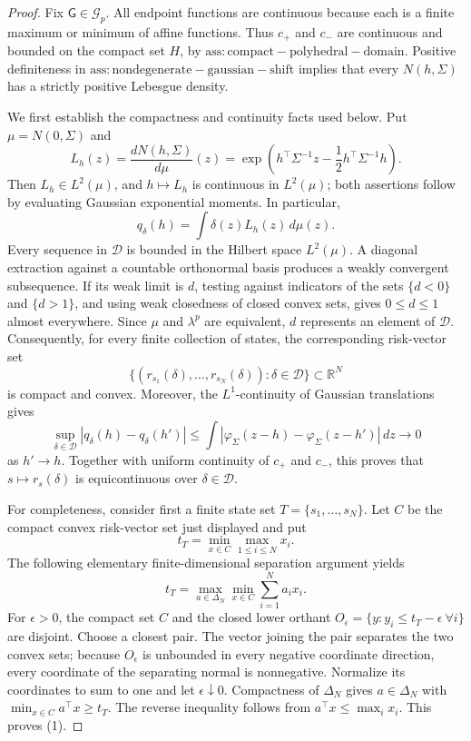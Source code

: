 \documentclass{article}
\begin{document}
\begin{proof}
Fix \(\mathsf G\in\mathcal G_p\). All endpoint functions are continuous because each is a finite maximum or minimum of affine functions. Thus \(c_{+}\) and \(c_{-}\) are continuous and bounded on the compact set \(H\), by \(\mathrm{ass:compact-polyhedral-domain}\). Positive definiteness in \(\mathrm{ass:nondegenerate-gaussian-shift}\) implies that every \(N(h,\Sigma)\) has a strictly positive Lebesgue density.

We first establish the compactness and continuity facts used below. Put \(\mu=N(0,\Sigma)\) and
\[
 L_h(z)=\frac{dN(h,\Sigma)}{d\mu}(z)
 =\exp\!\left(h^{\top}\Sigma^{-1}z-\frac12h^{\top}\Sigma^{-1}h\right).
\]
Then \(L_h\in L^2(\mu)\), and \(h\mapsto L_h\) is continuous in \(L^2(\mu)\); both assertions follow by evaluating Gaussian exponential moments. In particular,
\[
 q_{\delta}(h)=\int\delta(z)L_h(z)\,d\mu(z).
\]
Every sequence in \(\mathcal D\) is bounded in the Hilbert space \(L^2(\mu)\). A diagonal extraction against a countable orthonormal basis produces a weakly convergent subsequence. If its weak limit is \(d\), testing against indicators of the sets \(\{d<0\}\) and \(\{d>1\}\), and using weak closedness of closed convex sets, gives \(0\leq d\leq1\) almost everywhere. Since \(\mu\) and \(\lambda^p\) are equivalent, \(d\) represents an element of \(\mathcal D\). Consequently, for every finite collection of states, the corresponding risk-vector set
\[
 \bigl\{(r_{s_1}(\delta),\ldots,r_{s_N}(\delta)):\delta\in\mathcal D\bigr\}\subset\mathbb R^N
\]
is compact and convex. Moreover, the \(L^1\)-continuity of Gaussian translations gives
\[
 \sup_{\delta\in\mathcal D}|q_{\delta}(h)-q_{\delta}(h')|
 \leq\int|\varphi_{\Sigma}(z-h)-\varphi_{\Sigma}(z-h')|\,dz\longrightarrow0
\]
as \(h'\to h\). Together with uniform continuity of \(c_{+}\) and \(c_{-}\), this proves that \(s\mapsto r_s(\delta)\) is equicontinuous over \(\delta\in\mathcal D\).

For completeness, consider first a finite state set \(T=\{s_1,\ldots,s_N\}\). Let \(C\) be the compact convex risk-vector set just displayed and put
\[
 t_T=\min_{x\in C}\max_{1\leq i\leq N}x_i.
\]
The following elementary finite-dimensional separation argument yields
\[
 t_T=\max_{a\in\Delta_N}\min_{x\in C}\sum_{i=1}^Na_ix_i. \tag{1}
\]
For \(\epsilon>0\), the compact set \(C\) and the closed lower orthant \(O_{\epsilon}=\{y:y_i\leq t_T-\epsilon\ \forall i\}\) are disjoint. Choose a closest pair. The vector joining the pair separates the two convex sets; because \(O_{\epsilon}\) is unbounded in every negative coordinate direction, every coordinate of the separating normal is nonnegative. Normalize its coordinates to sum to one and let \(\epsilon\downarrow0\). Compactness of \(\Delta_N\) gives \(a\in\Delta_N\) with \(\min_{x\in C}a^{\top}x\geq t_T\). The reverse inequality follows from \(a^{\top}x\leq\max_i x_i\). This proves (1).


\end{proof}
\end{document}
